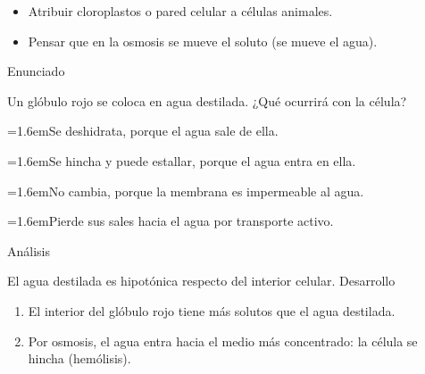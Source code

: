 \documentclass[10pt,a4paper,twocolumn]{article}
\newcommand{\alternativa}[2]{\par\noindent\hangindent=1.6em\hangafter=1\makebox[1.6em][l]{\tecla{#1}}#2\par}
\newcommand{\clave}[1]{\par\smallskip{\sffamily\footnotesize\color{esmeralda} Clave \teclaok{#1}}\par}
\begin{document}
\begin{errorfrecuente}
\begin{itemize}
  \item Atribuir cloroplastos o pared celular a células animales.
  \item Pensar que en la osmosis se mueve el soluto (se mueve el agua).
\end{itemize}
\end{errorfrecuente}

\begin{ejemplo}
{\sffamily\footnotesize\color{zinc500} Enunciado}\par
Un glóbulo rojo se coloca en agua destilada. ¿Qué ocurrirá con la célula?
\alternativa{A}{Se deshidrata, porque el agua sale de ella.}
\alternativa{B}{Se hincha y puede estallar, porque el agua entra en ella.}
\alternativa{C}{No cambia, porque la membrana es impermeable al agua.}
\alternativa{D}{Pierde sus sales hacia el agua por transporte activo.}
\clave{B}
{\sffamily\footnotesize\color{zinc500} Análisis}\par El agua destilada es hipotónica respecto del interior celular.
{\sffamily\footnotesize\color{zinc500} Desarrollo}
\begin{enumerate}
  \item El interior del glóbulo rojo tiene más solutos que el agua destilada.
  \item Por osmosis, el agua entra hacia el medio más concentrado: la célula se hincha (hemólisis).
\end{enumerate}
\end{ejemplo}
\end{document}
